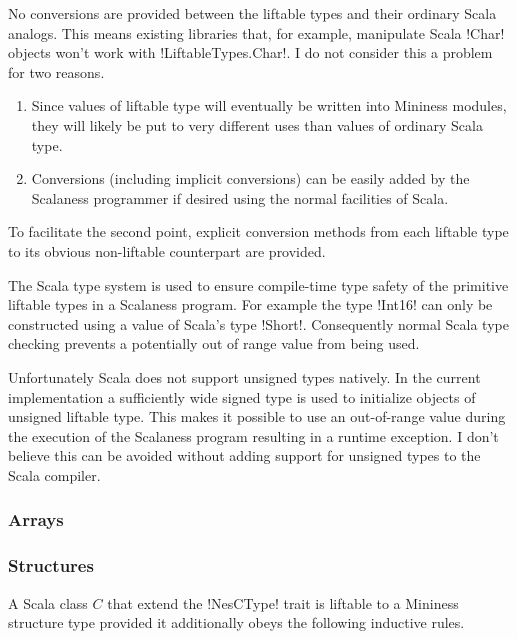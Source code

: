 No conversions are provided between the liftable types and their ordinary Scala analogs. This
means existing libraries that, for example, manipulate Scala !Char! objects won't work with
!LiftableTypes.Char!. I do not consider this a problem for two reasons.
\begin{enumerate}
\item Since values of liftable type will eventually be written into Mininess modules, they will
  likely be put to very different uses than values of ordinary Scala type.
\item Conversions (including implicit conversions) can be easily added by the Scalaness
  programmer if desired using the normal facilities of Scala.
\end{enumerate}

To facilitate the second point, explicit conversion methods from each liftable type to its
obvious non-liftable counterpart are provided.


The Scala type system is used to ensure compile-time type safety of the primitive liftable types
in a Scalaness program. For example the type !Int16! can only be constructed using a value of
Scala's type !Short!. Consequently normal Scala type checking prevents a potentially out of
range value from being used.

Unfortunately Scala does not support unsigned types natively. In the current implementation a
sufficiently wide signed type is used to initialize objects of unsigned liftable type. This
makes it possible to use an out-of-range value during the execution of the Scalaness program
resulting in a runtime exception. I don't believe this can be avoided without adding support for
unsigned types to the Scala compiler.

\subsubsection{Arrays}
\label{section-arrays-design}

\subsubsection{Structures}
\label{section-structures-design}

A Scala class $C$ that extend the !NesCType! trait is liftable to a Mininess structure type
provided it additionally obeys the following inductive rules.

